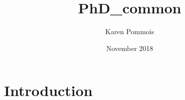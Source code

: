 \documentclass{article}
\title{PhD_common}
\author{Karen Pommois}
\date{November 2018}
\begin{document}
\maketitle

\section{Introduction}
\end{document}
